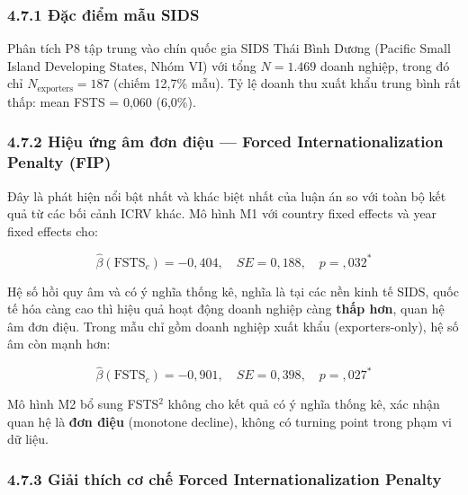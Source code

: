\documentclass[12pt,a4paper]{article}
\begin{document}
\hypertarget{471-ux111ux1eb7c-ux111iux1ec3m-mux1eabu-sids}{%
\subsubsection{4.7.1 Đặc điểm mẫu
SIDS}\label{471-ux111ux1eb7c-ux111iux1ec3m-mux1eabu-sids}}

Phân tích P8 tập trung vào chín quốc gia SIDS Thái Bình Dương (Pacific
Small Island Developing States, Nhóm VI) với tổng \(N = 1.469\) doanh
nghiệp, trong đó chỉ \(N_{\text{exporters}} = 187\) (chiếm 12,7\% mẫu).
Tỷ lệ doanh thu xuất khẩu trung bình rất thấp: mean FSTS = 0,060
(6,0\%).

\hypertarget{472-hiux1ec7u-ux1ee9ng-uxe2m-ux111ux1a1n-ux111iux1ec7u--forced-internationalization-penalty-fip}{%
\subsubsection{4.7.2 Hiệu ứng âm đơn điệu --- Forced
Internationalization Penalty
(FIP)}\label{472-hiux1ec7u-ux1ee9ng-uxe2m-ux111ux1a1n-ux111iux1ec7u--forced-internationalization-penalty-fip}}

Đây là phát hiện nổi bật nhất và khác biệt nhất của luận án so với toàn
bộ kết quả từ các bối cảnh ICRV khác. Mô hình M1 với country fixed
effects và year fixed effects cho:

\[\hat{\beta}(\text{FSTS}_c) = -0{,}404, \quad SE = 0{,}188, \quad p = {,}032^{*}\]

Hệ số hồi quy âm và có ý nghĩa thống kê, nghĩa là tại các nền kinh tế
SIDS, quốc tế hóa càng cao thì hiệu quả hoạt động doanh nghiệp càng
\textbf{thấp hơn}, quan hệ âm đơn điệu. Trong mẫu chỉ gồm doanh nghiệp
xuất khẩu (exporters-only), hệ số âm còn mạnh hơn:

\[\hat{\beta}(\text{FSTS}_c) = -0{,}901, \quad SE = 0{,}398, \quad p = {,}027^{*}\]

Mô hình M2 bổ sung FSTS\(^2\) không cho kết quả có ý nghĩa thống kê, xác
nhận quan hệ là \textbf{đơn điệu} (monotone decline), không có turning
point trong phạm vi dữ liệu.

\hypertarget{473-giux1ea3i-thuxedch-cux1a1-chux1ebf-forced-internationalization-penalty}{%
\subsubsection{4.7.3 Giải thích cơ chế Forced Internationalization
Penalty}\label{473-giux1ea3i-thuxedch-cux1a1-chux1ebf-forced-internationalization-penalty}}
\end{document}
